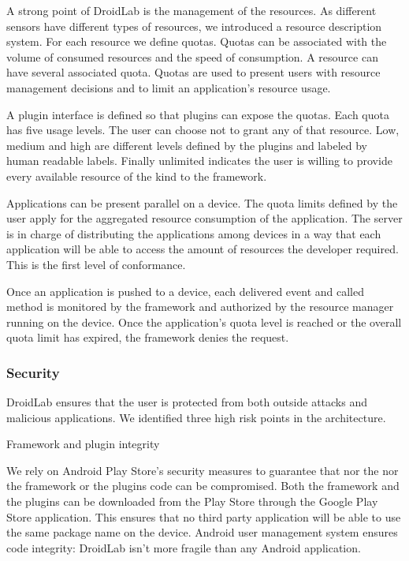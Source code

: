 \documentclass[conference,letterpaper]{IEEEtran}
\begin{document}
A strong point of DroidLab is the management of the resources. As different sensors have different types of resources, we introduced a resource description system. For each resource we define quotas. Quotas can be associated with the volume of consumed resources and the speed of consumption. A resource can have several associated quota. Quotas are used to present users with resource management decisions and to limit an application's resource usage.

A plugin interface is defined so that plugins can expose the quotas. Each quota has five usage levels. The user can choose not to grant any of that resource. Low, medium and high are different levels defined by the plugins and labeled by human readable labels. Finally unlimited indicates the user is willing to provide every available resource of the kind to the framework.

Applications can be present parallel on a device. The quota limits defined by the user apply for the aggregated resource consumption of the application. The server is in charge of distributing the applications among devices in a way that each application will be able to access the amount of resources the developer required. This is the first level of conformance.

Once an application is pushed to a device, each delivered event and called method is monitored by the framework and authorized by the resource manager running on the device. Once the application's quota level is reached or the overall quota limit has expired, the framework denies the request.

\subsubsection{Security}
DroidLab ensures that the user is protected from both outside attacks and malicious applications. We identified three high risk points in the architecture.

Framework and plugin integrity

We rely on Android Play Store's security measures to guarantee that nor the nor the framework or the plugins code can be compromised. Both the framework and the plugins can be downloaded from the Play Store through the Google Play Store application. This ensures that no third party application will be able to use the same package name on the device. Android user management system ensures code integrity: DroidLab isn't more fragile than any Android application.
\end{document}
